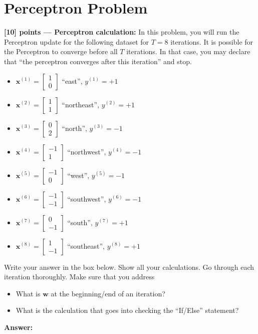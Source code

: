 \documentclass{article}
\begin{document}
\section{Perceptron Problem}
\noindent\textbf{[10] points --- Perceptron calculation:} In this problem, you will run the Perceptron update for the following dataset for \(T = 8\) iterations. It is possible for the Perceptron to converge before all \(T\) iterations. In that case, you may declare that ``the perceptron converges after this iteration'' and stop.
\begin{itemize}
  \item $\mathbf{x}^{(1)} = \begin{bmatrix} 1 \\ 0 \end{bmatrix}$ \quad ``east'',
        \quad $y^{(1)} = +1$
    \item $\mathbf{x}^{(2)} = \begin{bmatrix} 1 \\ 1 \end{bmatrix}$ \quad ``northeast'',
        \quad $y^{(2)} = +1$
    \item $\mathbf{x}^{(3)} = \begin{bmatrix} 0 \\ 2 \end{bmatrix}$ \quad ``north'',
        \quad $y^{(3)} = -1$
    \item $\mathbf{x}^{(4)} = \begin{bmatrix} -1 \\ 1 \end{bmatrix}$ \quad ``northwest'',
        \quad $y^{(4)} = -1$
    \item $\mathbf{x}^{(5)} = \begin{bmatrix} -1 \\ 0 \end{bmatrix}$ \quad ``west'',
        \quad $y^{(5)} = -1$
    \item $\mathbf{x}^{(6)} = \begin{bmatrix} -1 \\ -1 \end{bmatrix}$ \quad ``southwest'',
        \quad $y^{(6)} = -1$
    \item $\mathbf{x}^{(7)} = \begin{bmatrix} 0 \\ -1 \end{bmatrix}$ \quad ``south'',
        \quad $y^{(7)} = +1$
    \item $\mathbf{x}^{(8)} = \begin{bmatrix} 1 \\ -1 \end{bmatrix}$ \quad ``southeast'',
        \quad $y^{(8)} = +1$
\end{itemize}
Write your answer in the box below. Show all your calculations.
Go through each iteration thoroughly.
Make sure that you address
\begin{itemize}
  \item
What is $\mathbf{w}$ at the beginning/end of an iteration?
  \item What is the calculation that goes into checking the ``If/Else'' statement?

\end{itemize}

\begin{tcolorbox}
\textbf{Answer: }


\end{tcolorbox}
\end{document}
